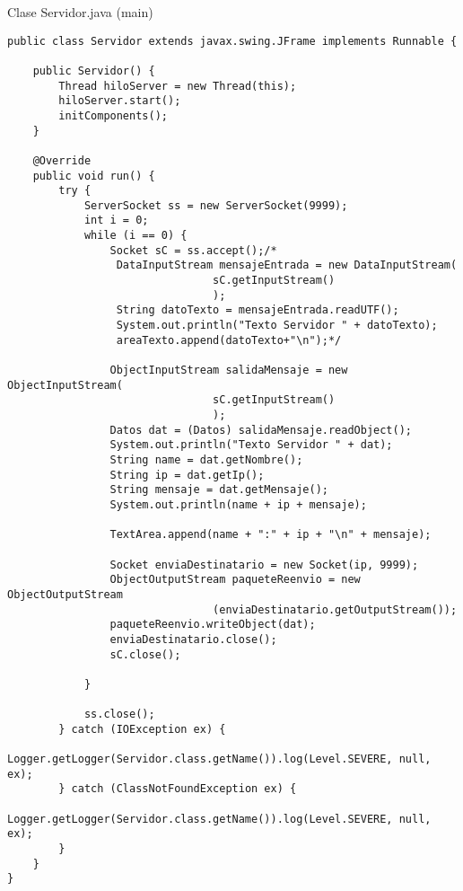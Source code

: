 \begin{center}
Clase Servidor.java (main)
\end{center}

\begin{verbatim}
public class Servidor extends javax.swing.JFrame implements Runnable {

    public Servidor() {
        Thread hiloServer = new Thread(this);
        hiloServer.start();
        initComponents();
    }
		
    @Override
    public void run() {
        try {
            ServerSocket ss = new ServerSocket(9999);
            int i = 0;
            while (i == 0) {
                Socket sC = ss.accept();/*
                 DataInputStream mensajeEntrada = new DataInputStream(
								sC.getInputStream()
								);
                 String datoTexto = mensajeEntrada.readUTF();
                 System.out.println("Texto Servidor " + datoTexto);
                 areaTexto.append(datoTexto+"\n");*/

                ObjectInputStream salidaMensaje = new ObjectInputStream(
								sC.getInputStream()
								);
                Datos dat = (Datos) salidaMensaje.readObject();
                System.out.println("Texto Servidor " + dat);
                String name = dat.getNombre();
                String ip = dat.getIp();
                String mensaje = dat.getMensaje();
                System.out.println(name + ip + mensaje);

                TextArea.append(name + ":" + ip + "\n" + mensaje);

                Socket enviaDestinatario = new Socket(ip, 9999);
                ObjectOutputStream paqueteReenvio = new ObjectOutputStream
								(enviaDestinatario.getOutputStream());
                paqueteReenvio.writeObject(dat);
                enviaDestinatario.close();
                sC.close();

            }

            ss.close();
        } catch (IOException ex) {
            Logger.getLogger(Servidor.class.getName()).log(Level.SEVERE, null, ex);
        } catch (ClassNotFoundException ex) {
            Logger.getLogger(Servidor.class.getName()).log(Level.SEVERE, null, ex);
        }
    }
}
\end{verbatim} \vspace{1cm}